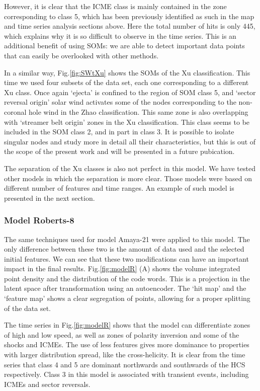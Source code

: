 However, it is clear that the ICME class is mainly contained in the zone corresponding to class 5, which has been previously identified as such in the map and time series analysis sections above. Here the total number of hits is only 445, which explains why it is so difficult to observe in the time series. This is an additional benefit of using SOMs: we are able to detect important data points that can easily be overlooked with other methods.

In a similar way, Fig.\ref{fig:SWtXu} shows the SOMs of the Xu classification. This time we used four subsets of the data set, each one corresponding to a different Xu class. Once again `ejecta' is confined to the region of SOM class 5, and `sector reversal origin' solar wind activates some of the nodes corresponding to the non-coronal hole wind in the Zhao classification. This same zone is also overlapping with `streamer belt origin' zones in the Xu classification. This class seems to be included in the SOM class 2, and in part in class 3. It is possible to isolate singular nodes and study more in detail all their characteristics, but this is out of the scope of the present work and will be presented in a future pubication.

The separation of the Xu classes is also not perfect in this model. We have tested other models in which the separation is more clear. Those models were based on different number of features and time ranges. An example of such model is presented in the next section.

\subsubsection{Model Roberts-8}
The same techniques used for model Amaya-21 were applied to this model. The only difference between these two is the amount of data used and the selected initial features. We can see that these two modifications can have an important impact in the final results. Fig.\ref{fig:modelR} (A) shows the volume integrated point density and the distribution of the code words. This is a projection in the latent space after transformation using an autoencoder. The `hit map' and the `feature map' shows a clear segregation of points, allowing for a proper splitting of the data set.

The time series in Fig.\ref{fig:modelR} shows that the model can differentiate zones of high and low speed, as well as zones of polarity inversion and some of the shocks and ICMEs. The use of less features gives more dominance to properties with larger distribution spread, like the cross-helicity. It is clear from the time series that class 4 and 5 are dominant northwards and southwards of the HCS respectively. Class 3 in this model is associated with transient events, including ICMEs and sector reversals.

